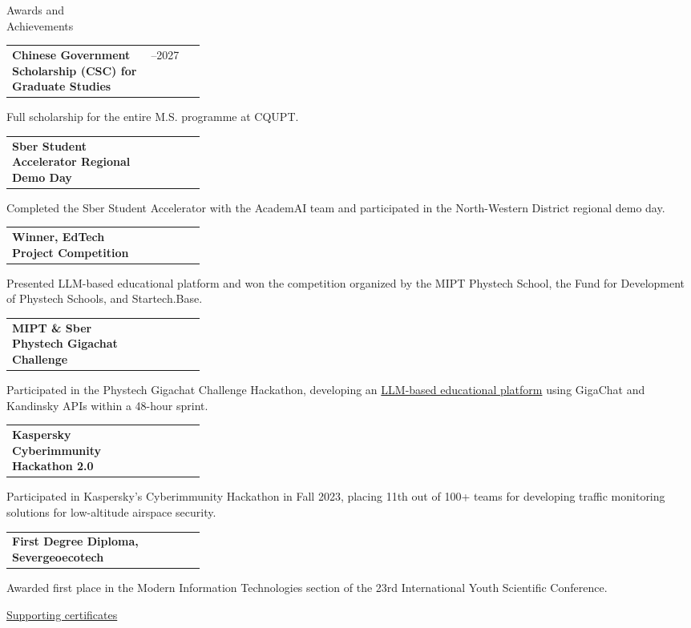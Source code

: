 \documentclass[11pt,a4paper]{article}
\makeatletter
\newcommand{\cvrow}[2]{%
  \noindent
  \begin{minipage}[t]{0.145\textwidth}
    \vspace{0pt}%
    \raggedright
    \fontsize{10.5}{12.5}\selectfont
    #1
  \end{minipage}%
  \hfill
  \begin{minipage}[t]{0.835\textwidth}
    \vspace{0pt}%
    #2
  \end{minipage}\par
}
\newcommand{\entry}[2]{%
  \begin{tabularx}{\linewidth}{@{}X >{\raggedleft\arraybackslash}p{0.28\linewidth}@{}}
    #1 & #2
  \end{tabularx}
}
\makeatother
\begin{document}
\cvrow{Awards and\\Achievements}{%
  \entry
    {\textbf{Chinese Government Scholarship (CSC) for Graduate Studies}}
    {2024--2027}
  Full scholarship for the entire M.S. programme at CQUPT.

  \vspace{0.45em}
  \entry
    {\textbf{Sber Student Accelerator Regional Demo Day}}
    {2023}
  Completed the Sber Student Accelerator with the AcademAI team and
  participated in the North-Western District regional demo day.

  \vspace{0.45em}
  \entry
    {\textbf{Winner, EdTech Project Competition}}
    {2023}
  Presented LLM-based educational platform and won the competition organized
  by the MIPT Phystech School, the Fund for Development of Phystech Schools,
  and Startech.Base.

  \vspace{0.45em}
  \entry
    {\textbf{MIPT \& Sber Phystech Gigachat Challenge}}
    {2023}
  Participated in the Phystech Gigachat Challenge Hackathon, developing
  an \href{https://github.com/AcademAI/youknow}{LLM-based educational
  platform} using GigaChat and Kandinsky APIs
  within a 48-hour sprint.

  \vspace{0.45em}
  \entry{\textbf{Kaspersky Cyberimmunity Hackathon 2.0}}
  {2023}
  Participated in Kaspersky’s Cyberimmunity Hackathon in Fall 2023,
  placing 11th out of 100+ teams for developing traffic monitoring
  solutions for low-altitude airspace security.

  \vspace{0.45em}
  \entry
    {\textbf{First Degree Diploma, Severgeoecotech}}
    {2022}
  Awarded first place in the Modern Information Technologies section of the
  23rd International Youth Scientific Conference.

  \vspace{0.3em}
  \href{https://iasenovets.github.io/files/certificates_selected_en_public_ready_v2.pdf}
       {\small Supporting certificates}
}

\vspace{0.50em}
\end{document}
